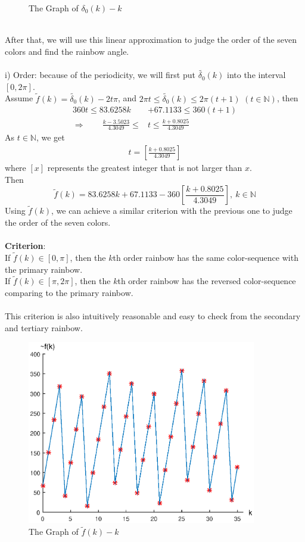 \documentclass{article}
\begin{document}
\begin{spacing}{1.5}
\begin{figure}[!htb]
\caption{The Graph of $\delta_0(k)-k$}
\end{figure}
\\
After that, we will use this linear approximation to judge the order of the seven colors and find the rainbow angle.\\
\\
i) Order: because of the periodicity, we will first put $\tilde{\delta_0}(k)$ into the interval $[0,2\pi]$.\\
Assume $\tilde{f}(k)=\tilde{\delta_0}(k)-2t\pi$, and $2\pi t\leq \tilde{\delta_0}(k)\leq 2\pi (t+1)$ \quad$(t\in\mathbb{N})$, then\begin{align*}
360t\leq 83.6258k&+67.1133\leq 360(t+1)\\
\Rightarrow \qquad\frac{k-3.5023}{4.3049}\leq &t \leq \frac{k+0.8025}{4.3049}
\end{align*}
As $t\in\mathbb{N}$, we get \begin{align*}
t=[\frac{k+0.8025}{4.3049}]
\end{align*}
where $[x]$ represents the greatest integer that is not larger than $x$.\\
Then 
$$\tilde{f}(k)=83.6258k + 67.1133 - 360[\frac{k+0.8025}{4.3049}], \ k\in \mathbb{N}$$
Using $\tilde{f}(k)$, we can achieve a similar criterion with the previous one to judge the order of the seven colors.\\\\
\textbf{Criterion}: \\
\indent \indent If $\tilde{f}(k)\in[0,\pi]$, then the $k$th order rainbow has the same color-sequence with the primary rainbow.\\
\indent \indent If $\tilde{f}(k)\in[\pi,2\pi]$, then the $k$th order rainbow has the reversed color-sequence comparing to the primary rainbow.\\
\\
This criterion is also intuitively reasonable and easy to check from the secondary and tertiary rainbow.\\
\begin{figure}[!htb]
\centering
\includegraphics[width=10cm]{Figure6.eps}
\caption{The Graph of $\tilde{f}(k)-k$}
\end{figure}
\\


\end{spacing}
\end{document}
